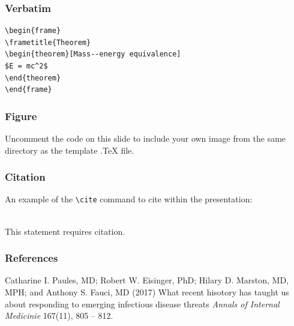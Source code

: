 \documentclass{beamer}
\begin{document}

\begin{frame}[fragile] %
\frametitle{Verbatim}
\begin{example}
\begin{verbatim}
\begin{frame}
\frametitle{Theorem}
\begin{theorem}[Mass--energy equivalence]
$E = mc^2$
\end{theorem}
\end{frame}\end{verbatim}
\end{example}
\end{frame}


\begin{frame}
\frametitle{Figure}
Uncomment the code on this slide to include your own image from the same directory as the template .TeX file.
\end{frame}


\begin{frame}[fragile] %
\frametitle{Citation}
An example of the \verb|\cite| command to cite within the presentation:\\~

This statement requires citation.
\end{frame}


\begin{frame}
\frametitle{References}
\footnotesize{
\begin{thebibliography}{99} %
 Catharine I. Paules, MD; Robert W. Eisinger, PhD; Hilary D. Marston, MD, MPH; and Anthony S. Fauci, MD (2017)
\newblock What recent hisotory has taught us about responding to emerging infectious disease threats
\newblock \emph{Annals of Internal Medicinie} 167(11), 805 -- 812.
\end{thebibliography}
}
\end{frame}
\end{document}
